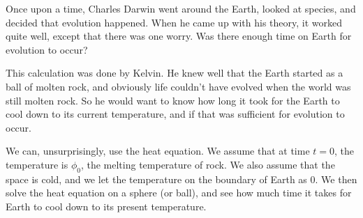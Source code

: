 \documentclass[a4paper]{article}
\begin{document}
\begin{eg}
  Once upon a time, Charles Darwin went around the Earth, looked at species, and decided that evolution happened. When he came up with his theory, it worked quite well, except that there was one worry. Was there enough time on Earth for evolution to occur?

  This calculation was done by Kelvin. He knew well that the Earth started as a ball of molten rock, and obviously life couldn't have evolved when the world was still molten rock. So he would want to know how long it took for the Earth to cool down to its current temperature, and if that was sufficient for evolution to occur.

  We can, unsurprisingly, use the heat equation. We assume that at time $t = 0$, the temperature is $\phi_0$, the melting temperature of rock. We also assume that the space is cold, and we let the temperature on the boundary of Earth as $0$. We then solve the heat equation on a sphere (or ball), and see how much time it takes for Earth to cool down to its present temperature.


\end{eg}
\end{document}
